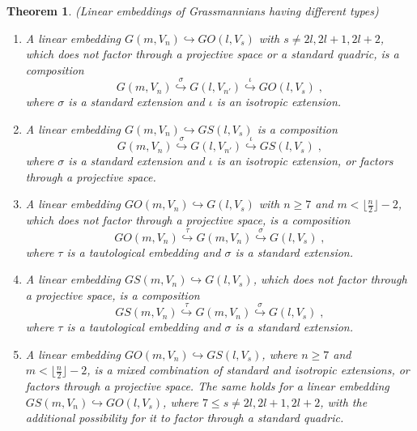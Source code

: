 \documentclass[12pt]{amsart}
\newtheorem{theorem}{Theorem}[section]
\begin{document}
\begin{theorem}\label{Theo Embed Mix Type} {\rm (Linear embeddings of Grassmannians having different types)}

\begin{enumerate}
\item[\rm (i)] A linear embedding $G(m,V_n)\hookrightarrow GO(l,V_s)$ with $s\ne2l,2l+1,2l+2$, which does not factor through a projective space or a standard quadric, is a composition
$$
G(m,V_n) \stackrel{\sigma}{\hookrightarrow} G(l,V_{n'}) \stackrel{\iota}{\hookrightarrow} GO(l,V_s) \;,
$$
where $\sigma$ is a standard extension and $\iota$ is an isotropic extension.
\item[\rm (ii)] A linear embedding $G(m,V_n)\hookrightarrow GS(l,V_{s})$ is a composition
$$
G(m,V_n) \stackrel{\sigma}{\hookrightarrow} G(l,V_{n'}) \stackrel{\iota}{\hookrightarrow} GS(l,V_{s}) \;,
$$
where $\sigma$ is a standard extension and $\iota$ is an isotropic extension, or factors through a projective space.
\item[\rm (iii)] A linear embedding $GO(m,V_n)\hookrightarrow G(l,V_s)$ with $n\geq 7$ and $m<\lfloor\frac{n}{2}\rfloor-2$, which does not factor through a projective space, is a composition
$$
GO(m,V_n) \stackrel{\tau}{\hookrightarrow} G(m,V_n) \stackrel{\sigma}{\hookrightarrow} G(l,V_s) \;,
$$
where $\tau$ is a tautological embedding and $\sigma$ is a standard extension.
\item[\rm (iv)] A linear embedding $GS(m,V_{n})\hookrightarrow G(l,V_s)$, which does not factor through a projective space, is a composition
$$
GS(m,V_{n}) \stackrel{\tau}{\hookrightarrow} G(m,V_{n}) \stackrel{\sigma}{\hookrightarrow} G(l,V_s) \;,
$$
where $\tau$ is a tautological embedding and $\sigma$ is a standard extension.

\item[\rm (v)] A linear embedding $GO(m,V_n)\hookrightarrow GS(l,V_s)$, where $n\geq 7$ and $m<\lfloor\frac{n}{2}\rfloor-2$, is a mixed combination of standard and isotropic extensions, or factors through a projective space. The same holds for a linear embedding $GS(m,V_n)\hookrightarrow GO(l,V_s)$, where $7\leq s\ne 2l,2l+1,2l+2$, with the additional possibility for it to factor through a standard quadric.
\end{enumerate}
\end{theorem}
\end{document}
